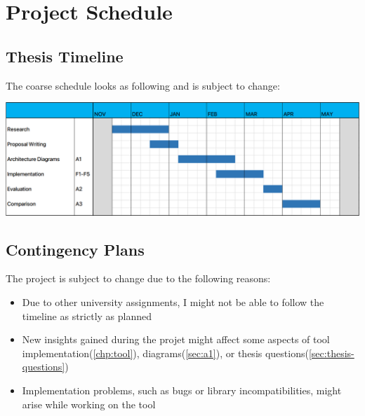 \chapter{Project Schedule}
\label{chp:schedule}

\section{Thesis Timeline}
\label{sec:gantt}

The coarse schedule looks as following and is subject to change:

\includegraphics[width=\textwidth]{Graphics/time.PNG}

\section{Contingency Plans}
\label{sec:contingency}

The project is subject to change due to the following reasons:

\begin{itemize}
    \item Due to other university assignments, I might not be able to follow the timeline as strictly as planned
    \item New insights gained during the projet might affect some aspects of tool implementation(\ref{chp:tool}), diagrams(\ref{sec:a1}), or thesis questions(\ref{sec:thesis-questions})
    \item Implementation problems, such as bugs or library incompatibilities, might arise while working on the tool
\end{itemize}